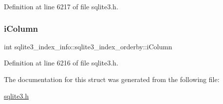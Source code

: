 Definition at line 6217 of file sqlite3.\+h.

\mbox{\label{structsqlite3__index__info_1_1sqlite3__index__orderby_a266396085bfda9acef3f13eaa170cd2f}} 
\subsubsection{\texorpdfstring{i\+Column}{iColumn}}
{\footnotesize\ttfamily int sqlite3\+\_\+index\+\_\+info\+::sqlite3\+\_\+index\+\_\+orderby\+::i\+Column}



Definition at line 6216 of file sqlite3.\+h.



The documentation for this struct was generated from the following file\+:\begin{DoxyCompactItemize}
\item 
\mbox{\hyperlink{sqlite3_8h}{sqlite3.\+h}}\end{DoxyCompactItemize}
